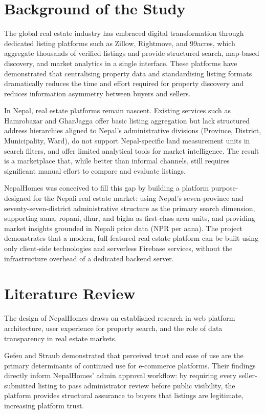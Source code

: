 \documentclass[12pt,a4paper]{report}
\begin{document}
\section{Background of the Study}

The global real estate industry has embraced digital transformation through
dedicated listing platforms such as Zillow, Rightmove, and 99acres, which
aggregate thousands of verified listings and provide structured search,
map-based discovery, and market analytics in a single interface. These platforms
have demonstrated that centralising property data and standardising listing
formats dramatically reduces the time and effort required for property discovery
and reduces information asymmetry between buyers and sellers.

In Nepal, real estate platforms remain nascent. Existing services such as
Hamrobazar and GharJagga offer basic listing aggregation but lack structured
address hierarchies aligned to Nepal's administrative divisions (Province,
District, Municipality, Ward), do not support Nepal-specific land measurement
units in search filters, and offer limited analytical tools for market
intelligence. The result is a marketplace that, while better than informal
channels, still requires significant manual effort to compare and evaluate
listings.

NepalHomes was conceived to fill this gap by building a platform purpose-designed
for the Nepali real estate market: using Nepal's seven-province and
seventy-seven-district administrative structure as the primary search dimension,
supporting aana, ropani, dhur, and bigha as first-class area units, and providing
market insights grounded in Nepali price data (NPR per aana). The project
demonstrates that a modern, full-featured real estate platform can be built using
only client-side technologies and serverless Firebase services, without the
infrastructure overhead of a dedicated backend server.

\section{Literature Review}

The design of NepalHomes draws on established research in web platform
architecture, user experience for property search, and the role of data
transparency in real estate markets.

Gefen and Straub \cite{gefen2004} demonstrated that perceived trust and
ease of use are the primary determinants of continued use for e-commerce
platforms. Their findings directly inform NepalHomes' admin approval workflow: by
requiring every seller-submitted listing to pass administrator review before
public visibility, the platform provides structural assurance to buyers that
listings are legitimate, increasing platform trust.
\end{document}
